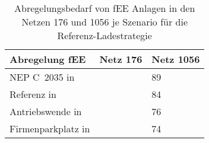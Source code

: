 {
\renewcommand{\arraystretch}{1.2}%
\begin{table}[H]
	\begin{center}
		\caption{Abregelungsbedarf von fEE Anlagen in den Netzen \num{176} und \num{1056} je Szenario für die Referenz-Ladestrategie}
		\begin{tabu} to 0.7\textwidth {X[2] X[1, r] X[1, r]}
			\toprule
			Abregelung fEE                            & Netz \num{176} & Netz \num{1056} \\ \midrule
			NEP C~\num{2035} in \si{\mwh}             &                & \num{89}        \\
			Referenz in \si{\mwh}                     &                & \num{84}        \\
			Antriebswende in \si{\mwh}                &                & \num{76}        \\
			\glqq Firmenparkplatz\grqq{} in \si{\mwh} &                & \num{74}        \\ \bottomrule
		\end{tabu}
		\label{tab:pv_dominated_week_a_fee_cur}
	\end{center}
	\vspace{-3mm}%
\end{table}
}
